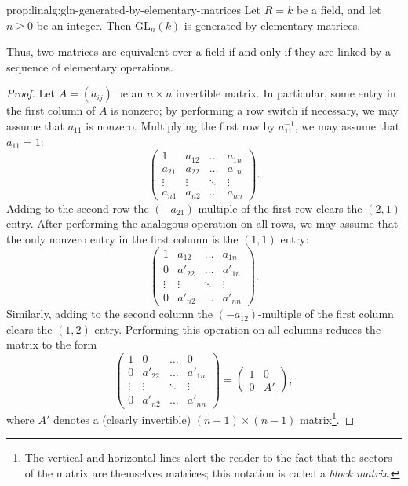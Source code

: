 \begin{prop}{}{prop:linalg:gln-generated-by-elementary-matrices}
  Let $R = k$ be a field, and let $n \geq 0$ be an integer. Then
  $\mathrm{GL}_n(k)$ is generated by elementary matrices.

  Thus, two matrices are equivalent over a field if and only if they
  are linked by a sequence of elementary operations.
\end{prop}
\begin{proof}
  Let $A = (a_{ij})$ be an $n \times n$ invertible matrix. In
  particular, some entry in the first column of $A$ is nonzero; by
  performing a row switch if necessary, we may assume that $a_{11}$ is
  nonzero. Multiplying the first row by $a_{11}^{-1}$, we may assume
  that $a_{11} = 1$:
  \[
    \begin{pmatrix}
      1 & a_{12} & \dots & a_{1n} \\
      a_{21} & a_{22} & \dots & a_{1n} \\
      \vdots & \vdots & \ddots & \vdots \\
      a_{n1} & a_{n2} & \dots & a_{nn}
    \end{pmatrix}.
  \]
  Adding to the second row the $(-a_{21})$-multiple of the first row
  clears the $(2,1)$ entry. After performing the analogous operation
  on all rows, we may assume that the only nonzero entry in the first
  column is the $(1,1)$ entry:
  \[
    \begin{pmatrix}
      1 & a_{12} & \dots & a_{1n} \\
      0 & a'_{22} & \dots & a'_{1n} \\
      \vdots & \vdots & \ddots & \vdots \\
      0 & a'_{n2} & \dots & a'_{nn}
    \end{pmatrix}.
  \]
  Similarly, adding to the second column the $(-a_{12})$-multiple of
  the first column clears the $(1,2)$ entry. Performing this operation
  on all columns reduces the matrix to the form
  \[
    \begin{pmatrix}
      1 & 0 & \dots & 0 \\
      0 & a'_{22} & \dots & a'_{1n} \\
      \vdots & \vdots & \ddots & \vdots \\
      0 & a'_{n2} & \dots & a'_{nn}
    \end{pmatrix}
    = \left(
      \begin{array}{c|c}
        1 & 0 \\
        \hline
        0 & A'
      \end{array}
    \right),
  \]
  where $A'$ denotes a (clearly invertible) $(n-1) \times (n-1)$
  matrix\footnote{The vertical and horizontal lines alert the reader
    to the fact that the sectors of the matrix are themselves
    matrices; this notation is called a \emph{block matrix}.}.


\end{proof}
